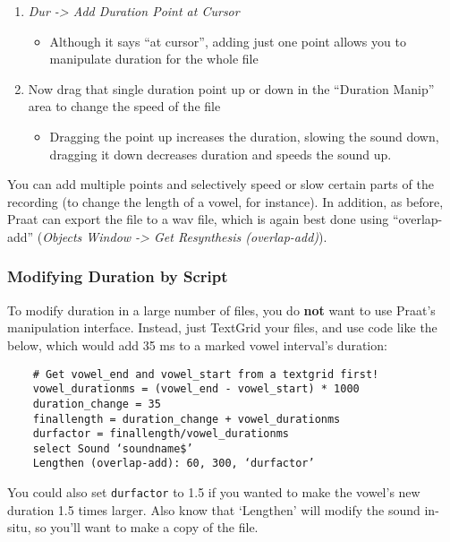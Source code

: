 \documentclass[11pt]{article}
\def\tightlist{}
\begin{document}
\begin{enumerate}
\def\labelenumi{\arabic{enumi}.}
\tightlist
\item
  \emph{Dur -\textgreater{} Add Duration Point at Cursor}

  \begin{itemize}
  \tightlist
  \item
    Although it says ``at cursor'', adding just one point allows you to
    manipulate duration for the whole file
  \end{itemize}
\item
  Now drag that single duration point up or down in the ``Duration
  Manip'' area to change the speed of the file

  \begin{itemize}
  \tightlist
  \item
    Dragging the point up increases the duration, slowing the sound
    down, dragging it down decreases duration and speeds the sound up.
  \end{itemize}
\end{enumerate}

You can add multiple points and selectively speed or slow certain parts
of the recording (to change the length of a vowel, for instance). In
addition, as before, Praat can export the file to a wav file, which is
again best done using ``overlap-add'' (\emph{Objects Window
-\textgreater{} Get Resynthesis (overlap-add)}).

\hypertarget{modifying-duration-by-script}{%
\subsubsection{Modifying Duration by
Script}\label{modifying-duration-by-script}}

To modify duration in a large number of files, you do \textbf{not} want
to use Praat's manipulation interface. Instead, just TextGrid your
files, and use code like the below, which would add 35 ms to a marked
vowel interval's duration:

\begin{verbatim}
    # Get vowel_end and vowel_start from a textgrid first!
    vowel_durationms = (vowel_end - vowel_start) * 1000
    duration_change = 35
    finallength = duration_change + vowel_durationms
    durfactor = finallength/vowel_durationms
    select Sound ‘soundname$’
    Lengthen (overlap-add): 60, 300, ‘durfactor’
\end{verbatim}

You could also set \texttt{durfactor} to 1.5 if you wanted to make the
vowel's new duration 1.5 times larger. Also know that `Lengthen' will
modify the sound in-situ, so you'll want to make a copy of the file.
\end{document}
